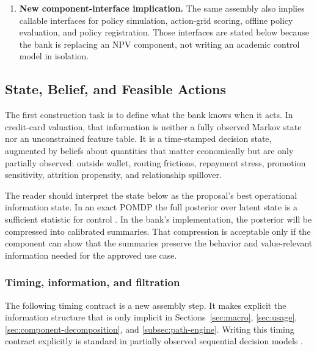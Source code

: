 \documentclass[11pt]{article}
\newcommand{\1}{\mathbf{1}}
\begin{document}
\begin{enumerate}[label=\arabic*.]
        the observation equations, the Bayesian filtering recursion, and the
        constrained belief-state Bellman recursion are new derivations in this
        proposal. They are introduced because the earlier sections name the
        ingredients of a dynamic system, while this chapter assembles them into
        a full state-space model.
  \item \textbf{New component-interface implication.} The same assembly also
        implies callable interfaces for policy simulation, action-grid scoring,
        offline policy evaluation, and policy registration. Those interfaces are
        stated below because the bank is replacing an NPV component, not writing
        an academic control model in isolation.
\end{enumerate}

\subsection{State, Belief, and Feasible Actions}

The first construction task is to define what the bank knows when it acts. In
credit-card valuation, that information is neither a fully observed Markov
state nor an unconstrained feature table. It is a time-stamped decision state,
augmented by beliefs about quantities that matter economically but are only
partially observed: outside wallet, routing frictions, repayment stress,
promotion sensitivity, attrition propensity, and relationship spillover.

The reader should interpret the state below as the proposal's best operational
information state. In an exact POMDP the full posterior over latent state is a
sufficient statistic for control \citep{smallwood1973pomdp,kaelbling1998pomdp}.
In the bank's implementation, the posterior will be compressed into calibrated
summaries. That compression is acceptable only if the component can show that
the summaries preserve the behavior and value-relevant information needed for
the approved use case.

\subsubsection{Timing, information, and filtration}
\label{subsec:state-space-timing}

The following timing contract is a new assembly step. It makes explicit the
information structure that is only implicit in Sections~\ref{sec:macro},
\ref{sec:usage}, \ref{sec:component-decomposition}, and
\ref{subsec:path-engine}. Writing this timing contract explicitly is standard
in partially observed sequential decision models
\citep{smallwood1973pomdp,kaelbling1998pomdp}.
\end{document}
